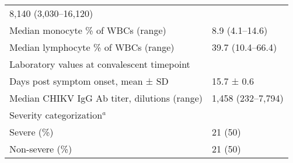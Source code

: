 \begin{tabular}{l l}
  8,140 (3,030–16,120)
  \\
  \-\tabindent Median monocyte \% of WBCs (range) &
  8.9 (4.1–14.6)
  \\
  \-\tabindent Median lymphocyte \% of WBCs (range) &
  39.7 (10.4–66.4)
  \\
  Laboratory values at convalescent timepoint &
  \\
  \-\tabindent Days post symptom onset, mean ± SD &
  15.7 ± 0.6
  \\
  \-\tabindent Median CHIKV IgG Ab titer, dilutions (range) &
  1,458 (232–7,794)
  \\
  Severity categorization$^a$ &
  \\
  \-\tabindent Severe (\%) &
  21 (50)
  \\
  \-\tabindent Non-severe (\%) &
  21 (50)
  \\
  \bottomrule
\end{tabular}